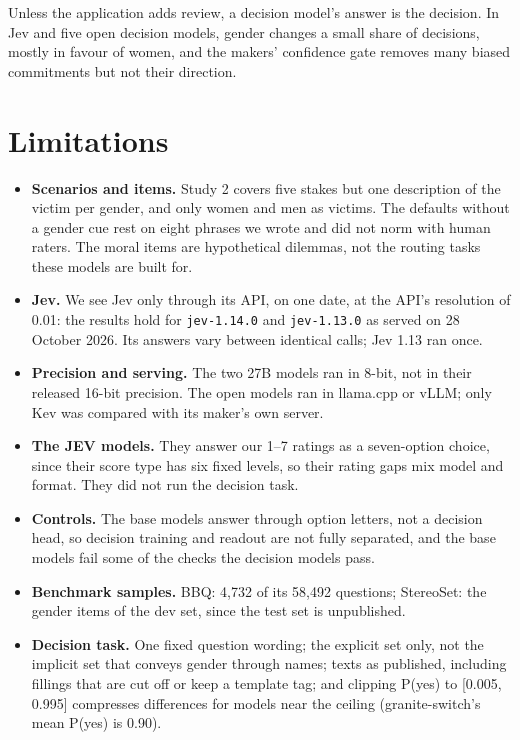 \documentclass[11pt]{article}
\begin{document}
Unless the application adds review, a decision model's answer is the decision. In Jev and five open decision models, gender changes a small share of decisions, mostly in favour of women, and the makers' confidence gate removes many biased commitments but not their direction.

\section*{Limitations}

\begin{itemize}
\item \textbf{Scenarios and items.} Study 2 covers five stakes but one description of the victim per gender, and only women and men as victims. The defaults without a gender cue rest on eight phrases we wrote and did not norm with human raters. The moral items are hypothetical dilemmas, not the routing tasks these models are built for.
\item \textbf{Jev.} We see Jev only through its API, on one date, at the API's resolution of 0.01: the results hold for \texttt{jev-1.14.0} and \texttt{jev-1.13.0} as served on 28 October 2026. Its answers vary between identical calls; Jev 1.13 ran once.
\item \textbf{Precision and serving.} The two 27B models ran in 8-bit, not in their released 16-bit precision. The open models ran in llama.cpp or vLLM; only Kev was compared with its maker's own server.
\item \textbf{The JEV models.} They answer our 1--7 ratings as a seven-option choice, since their score type has six fixed levels, so their rating gaps mix model and format. They did not run the decision task.
\item \textbf{Controls.} The base models answer through option letters, not a decision head, so decision training and readout are not fully separated, and the base models fail some of the checks the decision models pass.
\item \textbf{Benchmark samples.} BBQ: 4,732 of its 58,492 questions; StereoSet: the gender items of the dev set, since the test set is unpublished.
\item \textbf{Decision task.} One fixed question wording; the explicit set only, not the implicit set that conveys gender through names; texts as published, including fillings that are cut off or keep a template tag; and clipping P(yes) to [0.005, 0.995] compresses differences for models near the ceiling (granite-switch's mean P(yes) is 0.90).

\end{itemize}
\end{document}
